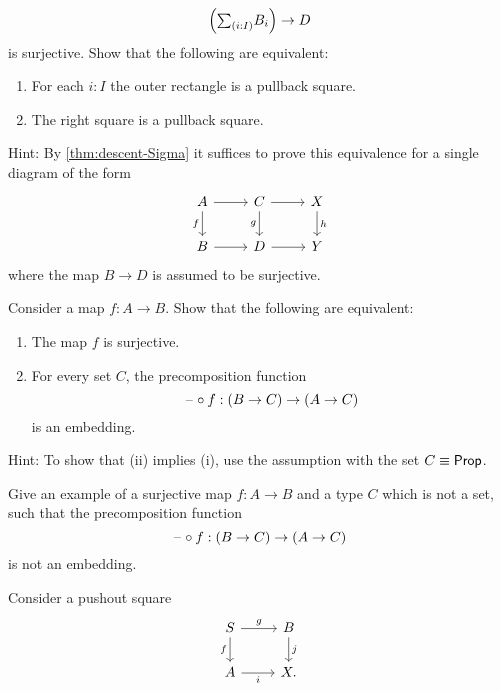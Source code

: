 \begin{exercises}
\begin{equation*}
    \Big(\sm{i:I}B_i\Big)\to D
  \end{equation*}
  is surjective. Show that the following are equivalent:
  \begin{enumerate}
  \item For each $i:I$ the outer rectangle is a pullback square.
  \item The right square is a pullback square.
  \end{enumerate}
  Hint: By \cref{thm:descent-Sigma} it suffices to prove this equivalence for a single diagram of the form
  \begin{equation*}
    \begin{tikzcd}
      A \arrow[r] \arrow[d,swap,"{f}"] &
      C \arrow[r] \arrow[d,swap,"g"] & X \arrow[d,"h"] \\
      B \arrow[r] & D \arrow[r] & Y 
    \end{tikzcd}
  \end{equation*}
  where the map $B \to D$ is assumed to be surjective.
  \exercise
  \begin{subexenum}
  \item \label{ex:surjective-precomp}Consider a map $f:A\to B$. Show that the following are equivalent:
    \begin{enumerate}
      \item The map $f$ is surjective.
      \item For every set $C$, the precomposition function
        \begin{equation*}
          \mathord{\hspace{1pt}\text{--}\hspace{1pt}}\circ f:(B\to C)\to (A\to C)
        \end{equation*}
        is an embedding.
    \end{enumerate}
    Hint: To show that (ii) implies (i), use the assumption with the set $C\equiv\mathsf{Prop}$.
  \item Give an example of a surjective map $f:A\to B$ and a type $C$ which is not a set, such that the precomposition function
    \begin{equation*}
      \mathord{\hspace{1pt}\text{--}\hspace{1pt}}\circ f:(B\to C)\to (A\to C)
    \end{equation*}
    is not an embedding.
  \end{subexenum}
  \exercise Consider a pushout square
  \begin{equation*}
    \begin{tikzcd}
      S \arrow[d,swap,"f"] \arrow[r,"g"] & B \arrow[d,"j"] \\
      A \arrow[r,swap,"i"] & X.
    \end{tikzcd}
  \end{equation*}

\end{exercises}
